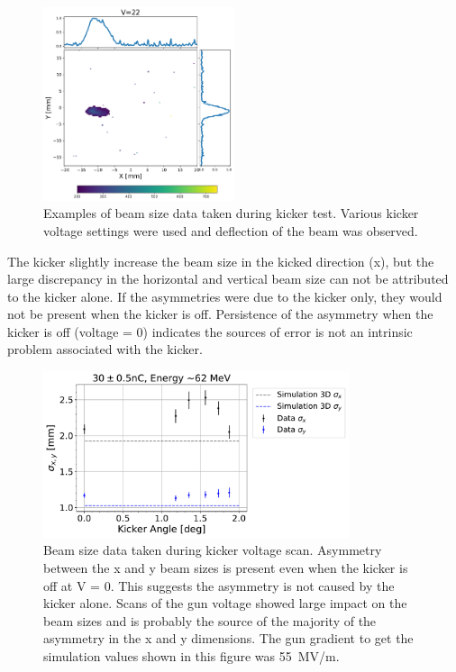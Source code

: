 \begin{figure}
	\includegraphics[width=0.5\textwidth]{./images/yag6_kicker_voltage22}%
	\caption{Examples of beam size data taken during kicker test. 
		Various kicker voltage settings were used and deflection of the beam was observed.}
	\label{fig:kickerbeamsize}
\end{figure}
The kicker slightly increase the beam size in the kicked direction (x), 
but the large discrepancy in the horizontal and vertical beam size can not be attributed to the kicker alone.
If the asymmetries were due to the kicker only, they would not be present when the kicker is off.
Persistence of the asymmetry when the kicker is off (voltage = 0) indicates 
the sources of error is not an intrinsic problem associated with the kicker.
\begin{figure}
	\centering
	\includegraphics[width=0.8\textwidth]{./images/xybeamsizes_high_charge_kicker_scan_angle_asymmetric}
	\caption{Beam size data taken during kicker voltage scan. Asymmetry between the x and y beam sizes
		 is present even when the kicker is off at V = 0. This suggests the asymmetry is not
	     caused by the kicker alone. Scans of the gun voltage showed large impact on the beam sizes
     	 and is probably the source of the majority of the asymmetry in the x and y dimensions.
	 The gun gradient to get the simulation values shown in this figure was \SI{55}{MV/m}.} 
     \label{fig:beamsize}
\end{figure}

